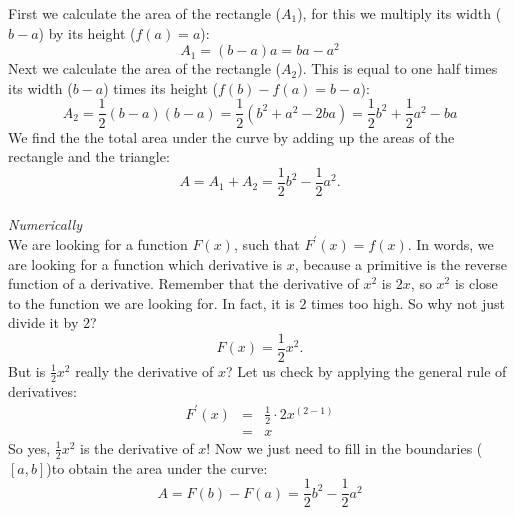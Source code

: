 \documentclass[a4paper]{report}
\begin{document}
\begin{mdframed}[backgroundcolor=exampcol]
First we calculate the area of the rectangle ($A_1$), for this we multiply its width ($b-a$) by its height ($f(a) = a$):
\begin{equation*}
A_1 = (b-a)a = ba - a^2
\end{equation*}
Next we calculate the area of the rectangle ($A_2$). This is equal to one half times its width ($b-a$) times its height ($f(b)-f(a)=b-a$):
\begin{equation*}
A_2 = \frac{1}{2} (b-a)(b-a) = \frac{1}{2} \left(b^2 + a^2 - 2ba \right) = \frac{1}{2} b^2 + \frac{1}{2} a^2 - ba 
\end{equation*}
We find the the total area under the curve by adding up the areas of the rectangle and the triangle:
\begin{equation*}
A = A_1 + A_2 = \frac{1}{2} b^2 - \frac{1}{2} a^2.
\end{equation*}\\[0.5ex]
\noindent\textit{Numerically}\\
We are looking for a function $F(x)$, such that $F^\prime(x) = f(x)$. In words, we are looking for a function which derivative is $x$, because a primitive is the reverse function of a derivative. Remember that the derivative of $x^2$ is $2x$, so $x^2$ is close to the function we are looking for. In fact, it is $2$ times too high. So why not just divide it by $2$?
\begin{equation*}
F(x) = \frac{1}{2} x^2.
\end{equation*}
But is $\frac{1}{2} x^2$ really the derivative of $x$? Let us check by applying the general rule of derivatives: 
\begin{eqnarray*}
F^\prime(x) &=& \frac{1}{2} \cdot 2 x^{(2-1)}\\
&=&x
\end{eqnarray*}
So yes, $\frac{1}{2} x^2$ is the derivative of $x$!
Now we just need to fill in the boundaries ($\left[a,b\right]$)to obtain the area under the curve:
\begin{equation*}
A = F(b) - F(a) = \frac{1}{2} b^2 - \frac{1}{2} a^2
\end{equation*}
\end{mdframed}
\end{document}
